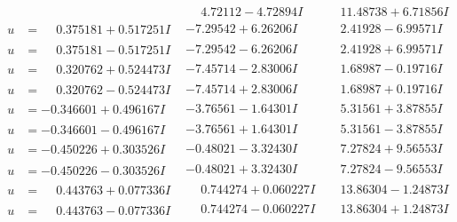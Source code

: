 \documentclass[1p]{elsarticle_modified}
\theoremstyle{definition}
\begin{document}
$$\begin{array}{c|c|c}
 & \phantom{-}4.72112 - 4.72894 I & \phantom{-}11.48738 + 6.71856 I \\ \hline\begin{aligned}
u &= \phantom{-}0.375181 + 0.517251 I\end{aligned}
 & -7.29542 + 6.26206 I & \phantom{-}2.41928 - 6.99571 I \\ \hline\begin{aligned}
u &= \phantom{-}0.375181 - 0.517251 I\end{aligned}
 & -7.29542 - 6.26206 I & \phantom{-}2.41928 + 6.99571 I \\ \hline\begin{aligned}
u &= \phantom{-}0.320762 + 0.524473 I\end{aligned}
 & -7.45714 - 2.83006 I & \phantom{-}1.68987 - 0.19716 I \\ \hline\begin{aligned}
u &= \phantom{-}0.320762 - 0.524473 I\end{aligned}
 & -7.45714 + 2.83006 I & \phantom{-}1.68987 + 0.19716 I \\ \hline\begin{aligned}
u &= -0.346601 + 0.496167 I\end{aligned}
 & -3.76561 - 1.64301 I & \phantom{-}5.31561 + 3.87855 I \\ \hline\begin{aligned}
u &= -0.346601 - 0.496167 I\end{aligned}
 & -3.76561 + 1.64301 I & \phantom{-}5.31561 - 3.87855 I \\ \hline\begin{aligned}
u &= -0.450226 + 0.303526 I\end{aligned}
 & -0.48021 - 3.32430 I & \phantom{-}7.27824 + 9.56553 I \\ \hline\begin{aligned}
u &= -0.450226 - 0.303526 I\end{aligned}
 & -0.48021 + 3.32430 I & \phantom{-}7.27824 - 9.56553 I \\ \hline\begin{aligned}
u &= \phantom{-}0.443763 + 0.077336 I\end{aligned}
 & \phantom{-}0.744274 + 0.060227 I & \phantom{-}13.86304 - 1.24873 I \\ \hline\begin{aligned}
u &= \phantom{-}0.443763 - 0.077336 I\end{aligned}
 & \phantom{-}0.744274 - 0.060227 I & \phantom{-}13.86304 + 1.24873 I \\ \hline\begin{aligned}

\end{aligned}
\end{array}$$
\end{document}
